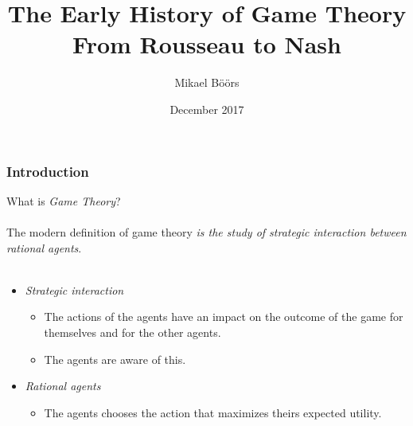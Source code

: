 \documentclass{beamer}
\title{The Early History of Game Theory\\
  From Rousseau to Nash}
\author{Mikael Böörs}
\institute{University of Gothenburg}
\date{December 2017}
\begin{document}
 
\frame{\titlepage}

\begin{frame}
\frametitle{Introduction}

What is \emph{Game Theory}?\\~\\

The modern definition of game theory \emph{is
the study of strategic interaction between rational agents}.\\~\\

\begin{itemize}
\item \emph{Strategic interaction}
  \begin{itemize}
    \item The actions of the agents have an impact on the outcome of
      the game for themselves and for the other agents.
    \item The agents are aware of this.
  \end{itemize}
\item \emph{Rational agents}
    \begin{itemize}
    \item The agents chooses the action that maximizes theirs expected utility.
  \end{itemize}
\end{itemize}  

  \end{frame}
\end{document}
